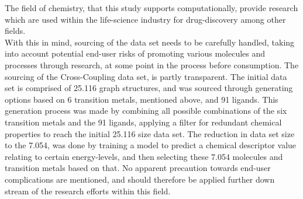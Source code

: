 The field of chemistry, that this study supports computationally, 
provide research which are used within the life-science industry for drug-discovery among other fields. \\

With this in mind, sourcing of the data set needs to be carefully handled, 
taking into account potential end-user risks of promoting various molecules and processes through research, 
at some point in the process before consumption. The sourcing of the Cross-Coupling data set, is partly transparent. 
The initial data set is comprised of 25.116 graph structures, and was sourced through generating options based on 6 transition metals, 
mentioned above, and 91 ligands. This generation process was made by combining all possible combinations of the six transition metals 
and the 91 ligands, applying a filter for redundant chemical properties to reach the initial 25.116 size data set\cite{Meyer2018}. 
The reduction in data set size to the 7.054, was done by training a model to predict a chemical descriptor value relating to certain 
energy-levels, and then selecting these 7.054 molecules and transition metals based on that. No apparent precaution towards end-user 
complications are mentioned, and should therefore be applied further down stream of the research efforts within this field. 

\newpage

